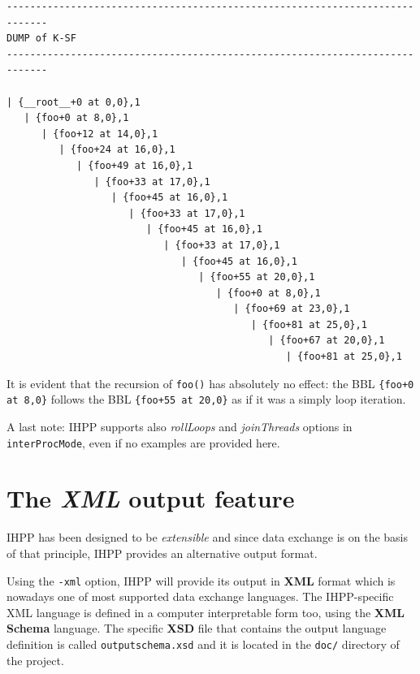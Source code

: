 \documentclass[a4paper,10pt]{report}
\begin{document}
\begin{lstlisting}[label=out14, 
caption={partial output of IHPP analysis in \texttt{interProcMode} of \texttt{prog4}}]
-----------------------------------------------------------------------------
DUMP of K-SF
-----------------------------------------------------------------------------

| {__root__+0 at 0,0},1
   | {foo+0 at 8,0},1
      | {foo+12 at 14,0},1
         | {foo+24 at 16,0},1
            | {foo+49 at 16,0},1
               | {foo+33 at 17,0},1
                  | {foo+45 at 16,0},1
                     | {foo+33 at 17,0},1
                        | {foo+45 at 16,0},1
                           | {foo+33 at 17,0},1
                              | {foo+45 at 16,0},1
                                 | {foo+55 at 20,0},1
                                    | {foo+0 at 8,0},1
                                       | {foo+69 at 23,0},1
                                          | {foo+81 at 25,0},1
                                             | {foo+67 at 20,0},1
                                                | {foo+81 at 25,0},1

\end{lstlisting}

\noindent
It is evident that the recursion of \verb|foo()| has absolutely no effect:
the BBL \verb|{foo+0 at 8,0}| follows the BBL \verb|{foo+55 at 20,0}| as if 
it was a simply loop iteration.

A last note: IHPP supports also \emph{rollLoops} and \emph{joinThreads} options
in \verb|interProcMode|, even if no examples are provided here.

\section{The \emph{XML} output feature}

IHPP has been designed to be \emph{extensible} and since data exchange is on the basis
of that principle, IHPP provides an alternative output format.

Using the \verb|-xml| option, IHPP will provide its output in \textbf{XML} format
which is nowadays one of most supported data exchange languages.
The IHPP-specific XML language is defined in a computer interpretable form too, 
using the \textbf{XML Schema} language. 
The specific \textbf{XSD} file that contains the output language definition 
is called \verb|outputschema.xsd| and it is located in the \verb|doc/| directory
of the project.
\end{document}
